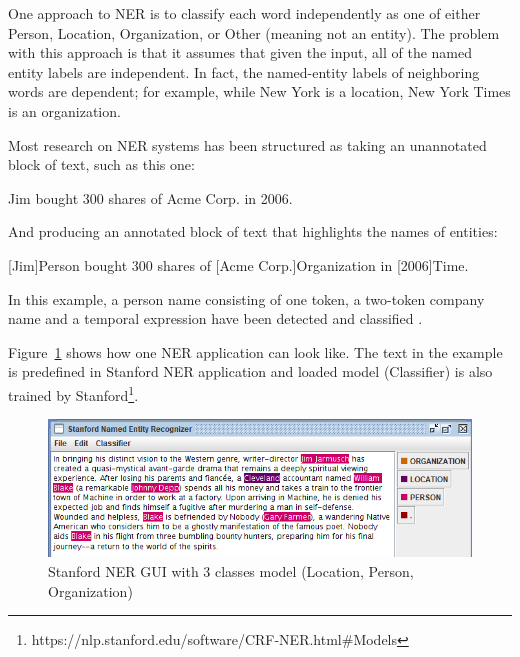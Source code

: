 \documentclass[thesis=M,english]{FITthesis}[2018/05/30]
\begin{document}
One approach to NER is to classify each word independently as one of either Person, Location, Organization, or Other (meaning not an entity). The problem with this approach is that it assumes that given the input, all of the named entity labels are independent. In fact, the named-entity labels of neighboring words are dependent; for example, while New York is a location, New York Times is an organization.



Most research on NER systems has been structured as taking an unannotated block of text, such as this one:

Jim bought 300 shares of Acme Corp. in 2006.

And producing an annotated block of text that highlights the names of entities:

[Jim]Person bought 300 shares of [Acme Corp.]Organization in [2006]Time.

In this example, a person name consisting of one token, a two-token company name and a temporal expression have been detected and classified \cite{wiki:NER}.

	Figure~\ref{fig:StanfordNER} shows how one NER application can look like. The text in the example is predefined in Stanford NER application and loaded model (Classifier) is also trained by Stanford\footnote{https://nlp.stanford.edu/software/CRF-NER.html\#Models}.

	\begin{figure}[H]\centering
		\includegraphics[width=\textwidth]{NER-Stanford}
		\caption{Stanford NER GUI with 3 classes model (Location, Person, Organization)}\label{fig:StanfordNER}
	\end{figure}
\end{document}
